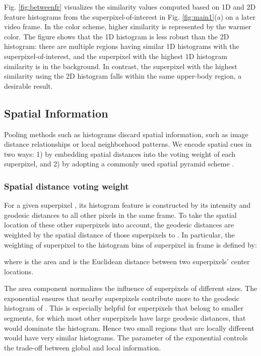 \documentclass[runningheads]{llncs}
\begin{document}
Fig. \ref{fig:betweenfr} visualizes the similarity values computed based on 1D and 2D feature histograms from the superpixel-of-interest in Fig. \ref{fig:main1}(a) on a later video frame. In the color scheme,  higher similarity is represented by the warmer color. The figure shows that the 1D histogram is less robust than the 2D histogram: there are multiple regions having similar 1D histograms with the superpixel-of-interest, and the superpixel with the highest 1D histogram similarity is in the background. In contrast, the superpixel with the highest similarity using the 2D histogram falls within the same upper-body region,  a desirable result.

\subsection{Spatial Information}
\label{sec:33}
Pooling methods such as histograms discard spatial information, such as image distance relationships or local neighborhood patterns. We encode spatial cues in two ways: 1) by embedding spatial distances into the voting weight of each superpixel, and 2) by adopting a commonly used spatial pyramid scheme \cite{1641019}.

\subsubsection{Spatial distance voting weight}
For a given superpixel , its histogram feature is constructed by its intensity and geodesic distances to all other pixels in the same frame. To take the spatial location of these other superpixels into account, the geodesic distances are weighted by the spatial distance of those superpixels to . In particular, the weighting of superpixel  to the histogram bins of superpixel  in frame  is defined by:

where  is the area and  is the Euclidean distance between two superpixels' center locations. 

The area component normalizes the influence of superpixels of different sizes.
The exponential ensures that nearby superpixels contribute more to the geodesic histogram of . This is especially helpful for superpixels that belong to smaller segments, for which most other superpixels have large geodesic distances, that would dominate the histogram. Hence two small regions that are locally different would have very similar histograms. The parameter  of the exponential controls the trade-off between global and local information. 
\end{document}
